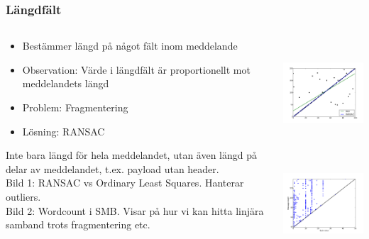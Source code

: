 \documentclass[xetex, 8pt]{beamer}
\begin{document}
    \begin{frame}
        \frametitle{Längdfält}
        \begin{columns}[t]
            \begin{column}[T]{6cm}
                \begin{itemize}
                    \item Bestämmer längd på något fält inom meddelande
                    \item Observation: Värde i längdfält är proportionellt
                        mot meddelandets längd
                    \item Problem: Fragmentering
                    \item Lösning: RANSAC
                \end{itemize}
                Inte bara längd för hela meddelandet, utan även längd på delar
                av meddelandet, t.ex. payload utan header.\\
                \vskip20pt
                Bild 1: RANSAC vs Ordinary Least Squares. Hanterar outliers.\\
                \vskip20pt
                Bild 2: Wordcount i SMB. Visar på hur vi kan hitta linjära
                samband trots fragmentering etc.
            \end{column}
            \begin{column}[T]{6cm}
                \includegraphics[height=4cm]{img/ransac.pdf}\\
                \includegraphics[height=4cm]{img/length.pdf}
            \end{column}
        \end{columns}
    \end{frame}
\end{document}
